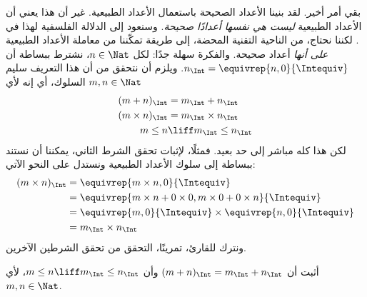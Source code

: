 \documentclass[../../../include/open-logic-section]{subfiles}
\begin{document}
بقي أمر أخير. لقد بنينا الأعداد الصحيحة باستعمال الأعداد الطبيعية. غير أن
هذا يعني أن الأعداد الطبيعية \emph{ليست هي نفسها أعدادًا صحيحة}. وسنعود
إلى الدلالة الفلسفية لهذا في . لكننا نحتاج، من الناحية
التقنية المحضة، إلى طريقة تمكّننا من معاملة الأعداد الطبيعية \emph{على أنها}
أعداد صحيحة. والفكرة سهلة جدًا: لكل $n \in \Nat$، نشترط ببساطة أن
$n_\Int = \equivrep{n, 0}{\Intequiv}$. ويلزم أن نتحقق من أن هذا التعريف
سليم السلوك، أي إنه لأي $m, n
\in \Nat$
\begin{align*}
	(m + n)_\Int &= m_\Int + n_\Int\\
	(m \times n)_\Int &= m_\Int \times n_\Int\\
	m \leq n &\liff m_\Int \leq n_\Int
\end{align*}
لكن هذا كله مباشر إلى حد بعيد. فمثلًا، لإثبات تحقق الشرط الثاني، يمكننا
أن نستند ببساطة إلى سلوك الأعداد الطبيعية ونستدل على النحو الآتي:
	\begin{align*}
		(m \times n)_\Int  &= \equivrep{m \times n, 0}{\Intequiv} \\
		&= \equivrep{m \times n + 0 \times 0, m \times 0 + 0 \times n}{\Intequiv} \\
		&= \equivrep{m, 0}{\Intequiv} \times \equivrep{n, 0}{\Intequiv} \\
		&= m_\Int \times n_\Int
	\end{align*}
ونترك للقارئ، تمرينًا، التحقق من تحقق الشرطين الآخرين.
\begin{prob}
	أثبت أن $(m + n)_\Int = m_\Int + n_\Int$ وأن
	$m \leq n \liff m_\Int \leq n_\Int$، لأي $m, n \in \Nat$.
\end{prob}
\end{document}
